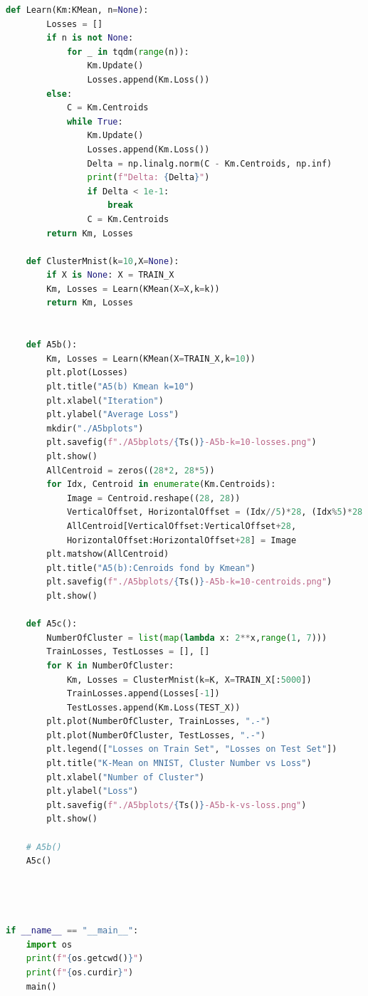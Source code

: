 \documentclass[]{article}
\begin{document}
\begin{lstlisting}[language=python]
    def Learn(Km:KMean, n=None):
        Losses = []
        if n is not None:
            for _ in tqdm(range(n)):
                Km.Update()
                Losses.append(Km.Loss())
        else:
            C = Km.Centroids
            while True:
                Km.Update()
                Losses.append(Km.Loss())
                Delta = np.linalg.norm(C - Km.Centroids, np.inf)
                print(f"Delta: {Delta}")
                if Delta < 1e-1:
                    break
                C = Km.Centroids
        return Km, Losses

    def ClusterMnist(k=10,X=None):
        if X is None: X = TRAIN_X
        Km, Losses = Learn(KMean(X=X,k=k))
        return Km, Losses


    def A5b():
        Km, Losses = Learn(KMean(X=TRAIN_X,k=10))
        plt.plot(Losses)
        plt.title("A5(b) Kmean k=10")
        plt.xlabel("Iteration")
        plt.ylabel("Average Loss")
        mkdir("./A5bplots")
        plt.savefig(f"./A5bplots/{Ts()}-A5b-k=10-losses.png")
        plt.show()
        AllCentroid = zeros((28*2, 28*5))
        for Idx, Centroid in enumerate(Km.Centroids):
            Image = Centroid.reshape((28, 28))
            VerticalOffset, HorizontalOffset = (Idx//5)*28, (Idx%5)*28
            AllCentroid[VerticalOffset:VerticalOffset+28,
            HorizontalOffset:HorizontalOffset+28] = Image
        plt.matshow(AllCentroid)
        plt.title("A5(b):Cenroids fond by Kmean")
        plt.savefig(f"./A5bplots/{Ts()}-A5b-k=10-centroids.png")
        plt.show()

    def A5c():
        NumberOfCluster = list(map(lambda x: 2**x,range(1, 7)))
        TrainLosses, TestLosses = [], []
        for K in NumberOfCluster:
            Km, Losses = ClusterMnist(k=K, X=TRAIN_X[:5000])
            TrainLosses.append(Losses[-1])
            TestLosses.append(Km.Loss(TEST_X))
        plt.plot(NumberOfCluster, TrainLosses, ".-")
        plt.plot(NumberOfCluster, TestLosses, ".-")
        plt.legend(["Losses on Train Set", "Losses on Test Set"])
        plt.title("K-Mean on MNIST, Cluster Number vs Loss")
        plt.xlabel("Number of Cluster")
        plt.ylabel("Loss")
        plt.savefig(f"./A5bplots/{Ts()}-A5b-k-vs-loss.png")
        plt.show()

    # A5b()
    A5c()




if __name__ == "__main__":
    import os
    print(f"{os.getcwd()}")
    print(f"{os.curdir}")
    main()            
        \end{lstlisting}
        
\end{document}
